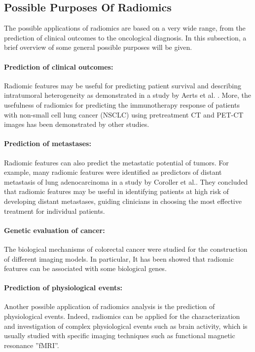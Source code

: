 \documentclass{standalone}
\begin{document}
\subsection{Possible Purposes Of Radiomics}

The possible applications of radiomics are based on a very wide range, from the prediction of clinical outcomes to the oncological diagnosis.
In this subsection, a brief overview of some general possible purposes will be given.
\paragraph{Prediction of clinical outcomes:} 
Radiomic features may be useful for predicting patient survival and describing intratumoral heterogeneity as demonstrated in a study by Aerts et al. \cite{Aerts}.
More, the usefulness of radiomics for predicting the immunotherapy response of patients with non-small cell lung cancer (NSCLC) using pretreatment CT and PET-CT images has been demonstrated by other studies\cite{tesicoppola}.
\paragraph{Prediction of metastases:}
Radiomic features can also predict the metastatic potential of tumors. 
For example, many radiomic features were identified as predictors of distant metastasis of lung adenocarcinoma in a study by Coroller et al.\cite{Coroller}.
They concluded that radiomic features may be useful in identifying patients at high risk of developing distant metastases, guiding clinicians in choosing the most effective treatment for individual patients.
\paragraph{Genetic evaluation of cancer:}
The biological mechanisms of colorectal cancer were studied for the construction of different imaging models. 
In particular, It has been showed that radiomic features can be associated with some biological genes\cite{tesicoppola}.
\paragraph{Prediction of physiological events:}
Another possible application of radiomics analysis is the prediction of physiological events. 
Indeed, radiomics can be applied for the characterization and investigation of complex physiological events such as brain activity, which is usually studied with specific imaging techniques such as functional magnetic resonance ”fMRI”\cite{tesicoppola}. 
\end{document}
